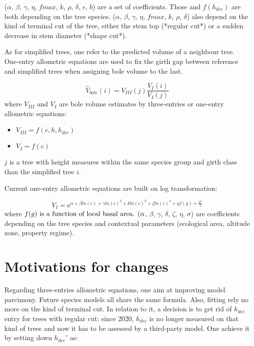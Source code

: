 (\( \alpha \), \( \beta \), \( \gamma \), \( \eta \), \( fmax \), \( k \), \( \rho \), \( \delta \), \( \epsilon \), \( b \)) are a set of coefficients. Those and \( f(h_{dec}) \) are both depending on the tree species.  
(\( \alpha \), \( \beta \), \( \gamma \), \( \eta \), \( fmax \), \( k \), \( \rho \), \( \delta \)) also depend on the kind of terminal cut of the tree, either the stem top (*regular cut*) or a sudden decrease in stem diameter (*shape cut*).  

As for simplified trees, one refer to the predicted volume of a neighbour tree. One-entry allometric equations are used to fix the girth gap between reference and simplified trees when assigning bole volume to the last.  

\begin{tcolorbox}[breakable, title = Volume imputation]
\begin{equation}
\hat V_{bole}(i) = V_{III}(j) \frac{V_{I}(i)}{V_{I}(j)}
\label{eq::imputation}
\end{equation}
where \( V_{III} \) and \( V_{I} \) are bole volume estimates by three-entries or one-entry allometric equations:  

\begin{itemize}
	\item \( V_{III} = f(c, h, h_{dec}) \)
	\item \( V_{I} = f(c) \)
\end{itemize}

\( j \) is a tree with height measures within the same species group and girth class than the simplified tree \( i \).  
\end{tcolorbox}

Current one-entry allometric equations are built on log transformation:  

\[ V_{I} = \mathrm{e}^{\alpha + \beta ln(c) + \gamma ln(c)^2 + \delta ln(c)^3 + \zeta ln(c)^4 + \eta f(g) + \frac{\sigma^2}{2}} \]
where \( f(g)$ is a function of local basal area.  
(\( \alpha \), \( \beta \), \( \gamma \), \( \delta \), \( \zeta \), \( \eta \), \( \sigma \)) are coefficients depending on the tree species and contextual parameters (ecological area, altitude zone, property regime).  

\section{Motivations for changes}

Regarding three-entries allometric equations, one aim at improving model parcimony. Future species models all share the same formula. Also, fitting rely no more on the kind of terminal cut.  
In relation to it, a decision is to get rid of \( h_{dec} \) entry for trees with regular cut: since 2020, \( h_{dec} \) is no longer measured on that kind of trees and now it has to be assessed by a third-party model. One achieve it by setting down \( h_{dec}' \) as:

